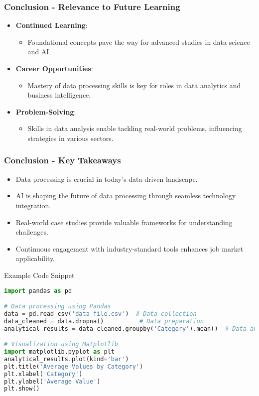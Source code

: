 \documentclass[aspectratio=169]{beamer}
\begin{document}
\begin{frame}[fragile]
    \frametitle{Conclusion - Relevance to Future Learning}
    \begin{itemize}
        \item \textbf{Continued Learning}:
        \begin{itemize}
            \item Foundational concepts pave the way for advanced studies in data science and AI.
        \end{itemize}
        
        \item \textbf{Career Opportunities}:
        \begin{itemize}
            \item Mastery of data processing skills is key for roles in data analytics and business intelligence.
        \end{itemize}
        
        \item \textbf{Problem-Solving}:
        \begin{itemize}
            \item Skills in data analysis enable tackling real-world problems, influencing strategies in various sectors.
        \end{itemize}
    \end{itemize}
\end{frame}

\begin{frame}[fragile]
    \frametitle{Conclusion - Key Takeaways}
    \begin{itemize}
        \item Data processing is crucial in today's data-driven landscape.
        \item AI is shaping the future of data processing through seamless technology integration.
        \item Real-world case studies provide valuable frameworks for understanding challenges.
        \item Continuous engagement with industry-standard tools enhances job market applicability.
    \end{itemize}

    \begin{block}{Example Code Snippet}
    \begin{lstlisting}[language=Python]
import pandas as pd

# Data processing using Pandas
data = pd.read_csv('data_file.csv')  # Data collection
data_cleaned = data.dropna()          # Data preparation
analytical_results = data_cleaned.groupby('Category').mean()  # Data analysis

# Visualization using Matplotlib
import matplotlib.pyplot as plt
analytical_results.plot(kind='bar')
plt.title('Average Values by Category')
plt.xlabel('Category')
plt.ylabel('Average Value')
plt.show()
    \end{lstlisting}
    \end{block}
\end{frame}
\end{document}
